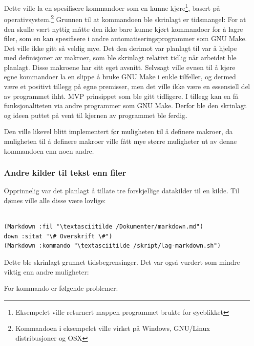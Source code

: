 \documentclass[norsk, 11pt, a4paper]{article}
\begin{document}
Dette ville la en spesifisere kommandoer som en kunne kjøre\footnote{Eksempelet ville returnert mappen programmet brukte for øyeblikket}, basert på operativsystem.\footnote{Kommandoen i eksempelet ville virket på Windows, GNU/Linux distribusjoner og OSX}
Grunnen til at kommandoen ble skrinlagt er tidsmangel: For at den skulle vært nyttig måtte den ikke bare kunne kjørt kommandoer for å lagre filer, som en kan spesifisere i andre automatiseringsprogrammer som GNU Make.
Det ville ikke gitt så veldig mye. Det den derimot var planlagt til var å hjelpe med definisjoner av makroer, som ble skrinlagt relativt tidlig når arbeidet ble planlagt. Disse makroene har sitt eget avsnitt.
Selvsagt ville evnen til å kjøre egne kommandoer la en slippe å bruke GNU Make i enkle tilfeller, og dermed være et positivt tillegg på egne premisser, men det ville ikke være en essensiell del av programmet ihht. MVP prinsippet som ble gitt tidligere.
I tillegg kan en få funksjonaliteten via andre programmer som GNU Make. Derfor ble den skrinlagt og ideen puttet på vent til kjernen av programmet ble ferdig.



Den ville likevel blitt implementert før muligheten til å definere makroer, da muligheten til å definere makroer ville fått mye større muligheter ut av denne kommandoen enn noen andre.



\subsubsection{Andre kilder til tekst enn filer}



Opprinnelig var det planlagt å tillate tre forskjellige datakilder til en kilde. Til dømes ville alle disse være lovlige:




\begin{lstlisting}

(Markdown :fil "\textasciitilde /Dokumenter/markdown.md")
down :sitat "\# Overskrift \#")
(Markdown :kommando "\textasciitilde /skript/lag-markdown.sh")
\end{lstlisting}




Dette ble skrinlagt grunnet tidsbegrensinger. Det var også vurdert som mindre viktig enn andre muligheter:



For kommando er følgende problemer:
\end{document}
